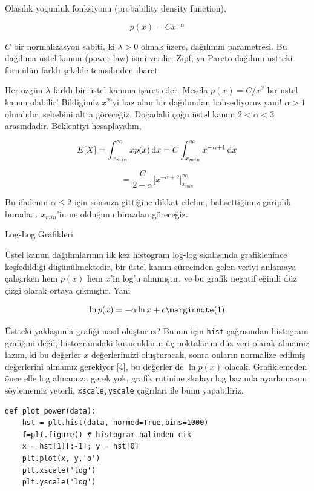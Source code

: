 \documentclass[12pt,fleqn]{article}\usepackage{../../common}
\begin{document}
Olasılık yoğunluk fonksiyonu (probability density function),

$$ p(x) = C x^{-\alpha}  $$

$C$ bir normalizasyon sabiti, ki $\lambda > 0$ olmak üzere, dağılımın
parametresi. Bu dağılıma üstel kanun (power law) ismi verilir. Zıpf, ya
Pareto dağılımı üstteki formülün farklı şekilde temsilinden ibaret. 

Her özgün $\lambda$ farklı bir üstel kanuna işaret eder. Mesela $p(x) = C/
x^2$ bir ustel kanun olabilir! Bildigimiz $x^2$'yi baz alan bir dağılımdan
bahsediyoruz yani! $\alpha > 1$ olmalıdır, sebebini altta
göreceğiz. Doğadaki çoğu üstel kanun $2 < \alpha < 3$
arasındadır. Beklentiyi hesaplayalım,

$$ 
E[X] = \int _{x_{min}}^{\infty} x p(x) \,\mathrm{d} x  = 
C \int _{x_{min}}^{\infty} x ^{-\alpha + 1} \,\mathrm{d} x
$$

$$ = \frac{C}{2-\alpha} \bigg[ x ^{-\alpha+2}  \bigg] _{x_{min}}^{\infty} $$

Bu ifadenin $\alpha \le 2$ için sonsuza gittiğine dikkat edelim,
bahsettiğimiz gariplik burada... $x_{min}$'in ne olduğunu birazdan göreceğiz.

Log-Log Grafikleri

Üstel kanun dağılımlarının ilk kez histogram log-log skalasında
grafiklenince keşfedildiği düşünülmektedir, bir üstel kanun sürecinden
gelen veriyi anlamaya çalışırken hem $p(x)$ hem $x$'in log'u alınmıştır, ve
bu grafik negatif eğimli düz çizgi olarak ortaya çıkmıştır. Yani

$$ 
\ln p(x) = -\alpha \ln x + c 
\mlabel{1}
$$

Üstteki yaklaşımla grafiği nasıl oluşturuz? Bunun için \verb!hist!
çağrısından histogram grafiğini değil, histogramdaki kutucukların üç
noktalarını düz veri olarak almamız lazım, ki bu değerler $x$ değerlerimizi
oluşturacak, sonra onların normalize edilmiş değerlerini almamız gerekiyor
[4], bu değerler de $\ln p(x)$ olacak. Grafiklemeden önce elle log almamıza
gerek yok, grafik rutinine skalayı log bazında ayarlamasını söylememiz
yeterli, \verb!xscale,yscale! çağrıları ile bunu yapabiliriz.

\begin{verbatim}
def plot_power(data):
    hst = plt.hist(data, normed=True,bins=1000)
    f=plt.figure() # histogram halinden cik
    x = hst[1][:-1]; y = hst[0]
    plt.plot(x, y,'o')
    plt.xscale('log')
    plt.yscale('log')
\end{verbatim}
\end{document}
